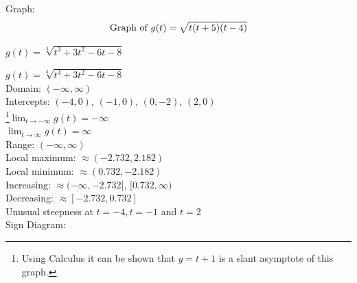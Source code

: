 \documentclass{ximera}
\begin{document}
\begin{question}
\begin {problem}
\begin{solution}
\smallskip

% 




Graph:\\
$$\text{Graph of $g(t) = \sqrt{t(t + 5)(t - 4)}$}$$
\end{solution}
\end {problem}

\begin{problem} \label{algfcngraphexlas}
$g(t) = \sqrt[3]{t^{3} + 3t^{2} - 6t - 8}$ 

\begin{solution}
$g(t) = \sqrt[3]{t^{3} + 3t^{2} - 6t - 8}$\\
Domain: $(-\infty, \infty)$\\
Intercepts:  $(-4,0)$, $(-1,0)$, $(0,-2)$, $(2,0)$\\
\footnote{Using Calculus it can be shown that $y = t + 1$ is a slant asymptote of this graph.}$ \lim_{t \rightarrow -\infty} g(t) = -\infty$\\
$ \lim_{t \rightarrow \infty} g(t) = \infty$\\
Range:  $(-\infty, \infty)$\\
Local maximum:  $\approx (-2.732, 2.182)$\\
Local minimum:  $\approx (0.732, -2.182)$\\
Increasing:  $\approx (-\infty, -2.732]$, $[0.732, \infty)$\\
Decreasing: $\approx [-2.732, 0.732]$\\
Unusual steepness at $t = -4, t = -1$ and $t = 2$\\




Sign Diagram:\\

% 


\end{solution}
\end{problem}
\end{question}
\end{document}
